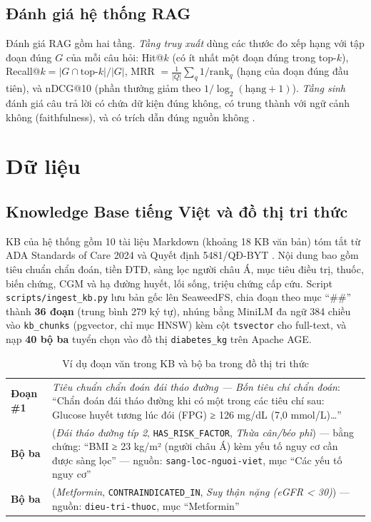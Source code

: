 \subsection{Đánh giá hệ thống RAG}

Đánh giá RAG gồm hai tầng. \emph{Tầng truy xuất} dùng các thước đo xếp hạng với tập đoạn đúng $G$ của mỗi câu hỏi: Hit@$k$ (có ít nhất một đoạn đúng trong top-$k$), Recall@$k=|G\cap\text{top-}k|/|G|$, MRR $=\frac1{|Q|}\sum_q 1/\mathrm{rank}_q$ (hạng của đoạn đúng đầu tiên), và nDCG@10 (phần thưởng giảm theo $1/\log_2(\text{hạng}+1)$). \emph{Tầng sinh} đánh giá câu trả lời có chứa dữ kiện đúng không, có trung thành với ngữ cảnh không (faithfulness), và có trích dẫn đúng nguồn không \cite{es2024ragas}.

\section{Dữ liệu}

\subsection{Knowledge Base tiếng Việt và đồ thị tri thức}

KB của hệ thống gồm 10 tài liệu Markdown (khoảng 18 KB văn bản) tóm tắt từ ADA Standards of Care 2024 \cite{ada2024} và Quyết định 5481/QĐ-BYT \cite{byt5481}. Nội dung bao gồm tiêu chuẩn chẩn đoán, tiền ĐTĐ, sàng lọc người châu Á, mục tiêu điều trị, thuốc, biến chứng, CGM và hạ đường huyết, lối sống, triệu chứng cấp cứu. Script \texttt{scripts/ingest\_kb.py} lưu bản gốc lên SeaweedFS, chia đoạn theo mục ``\#\#'' thành \textbf{36 đoạn} (trung bình 279 ký tự), nhúng bằng MiniLM đa ngữ 384 chiều vào \texttt{kb\_chunks} (pgvector, chỉ mục HNSW) kèm cột \texttt{tsvector} cho full-text, và nạp \textbf{40 bộ ba} tuyển chọn vào đồ thị \texttt{diabetes\_kg} trên Apache AGE.

\begin{table}[H]
\centering
\caption{Ví dụ đoạn văn trong KB và bộ ba trong đồ thị tri thức}
\label{tab:kb-sample}
\small
\begin{tabularx}{\linewidth}{@{}L{2.2cm}Y@{}}
\toprule
\textbf{Đoạn \#1} & \emph{Tiêu chuẩn chẩn đoán đái tháo đường — Bốn tiêu chí chẩn đoán}: ``Chẩn đoán đái tháo đường khi có một trong các tiêu chí sau: Glucose huyết tương lúc đói (FPG) ≥ 126 mg/dL (7,0 mmol/L)\ldots'' \\
\textbf{Bộ ba} & (\emph{Đái tháo đường típ 2}, \texttt{HAS\_RISK\_FACTOR}, \emph{Thừa cân/béo phì}) — bằng chứng: ``BMI ≥ 23 kg/m² (người châu Á) kèm yếu tố nguy cơ cần được sàng lọc'' — nguồn: \texttt{sang-loc-nguoi-viet}, mục ``Các yếu tố nguy cơ'' \\
\textbf{Bộ ba} & (\emph{Metformin}, \texttt{CONTRAINDICATED\_IN}, \emph{Suy thận nặng (eGFR < 30)}) — nguồn: \texttt{dieu-tri-thuoc}, mục ``Metformin'' \\
\bottomrule
\end{tabularx}
\end{table}

